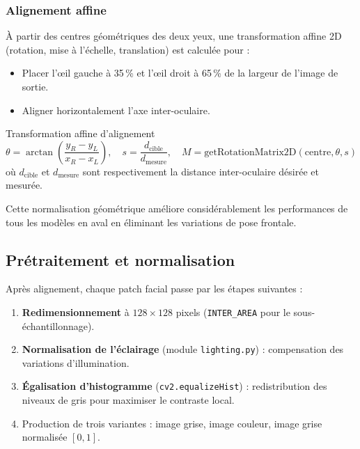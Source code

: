 \documentclass[12pt,a4paper]{article}
\begin{document}
\subsubsection{Alignement affine}

À partir des centres géométriques des deux yeux, une transformation affine 2D
(rotation, mise à l'échelle, translation) est calculée pour :
\begin{itemize}
  \item Placer l'œil gauche à 35\,\% et l'œil droit à 65\,\% de la largeur
        de l'image de sortie.
  \item Aligner horizontalement l'axe inter-oculaire.
\end{itemize}

\begin{formulebox}{Transformation affine d'alignement}
\[
  \theta = \arctan\!\left(\frac{y_R - y_L}{x_R - x_L}\right), \quad
  s = \frac{d_{\text{cible}}}{d_{\text{mesure}}}, \quad
  M = \text{getRotationMatrix2D}(\text{centre}, \theta, s)
\]
où $d_{\text{cible}}$ et $d_{\text{mesure}}$ sont respectivement la distance
inter-oculaire désirée et mesurée.
\end{formulebox}

Cette normalisation géométrique améliore considérablement les performances de
tous les modèles en aval en éliminant les variations de pose frontale.

\subsection{Prétraitement et normalisation}

Après alignement, chaque patch facial passe par les étapes suivantes :

\begin{enumerate}
  \item \textbf{Redimensionnement} à $128 \times 128$ pixels (\texttt{INTER\_AREA}
        pour le sous-échantillonnage).
  \item \textbf{Normalisation de l'éclairage} (module \texttt{lighting.py}) :
        compensation des variations d'illumination.
  \item \textbf{Égalisation d'histogramme} (\texttt{cv2.equalizeHist}) :
        redistribution des niveaux de gris pour maximiser le contraste local.
  \item Production de trois variantes : image grise, image couleur, image
        grise normalisée $[0,1]$.
\end{enumerate}
\end{document}
